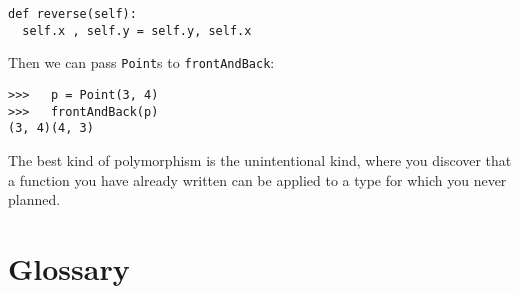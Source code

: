 \beforeverb
\begin{verbatim}
def reverse(self):
  self.x , self.y = self.y, self.x
\end{verbatim}
\afterverb
%
Then we can pass {\tt Point}s to {\tt frontAndBack}:

\beforeverb
\begin{verbatim}
>>>   p = Point(3, 4)
>>>   frontAndBack(p)
(3, 4)(4, 3)
\end{verbatim}
\afterverb
%
The best kind of polymorphism is the unintentional kind, where
you discover that a function you have already written can be
applied to a type for which you never planned.



\section{Glossary}

